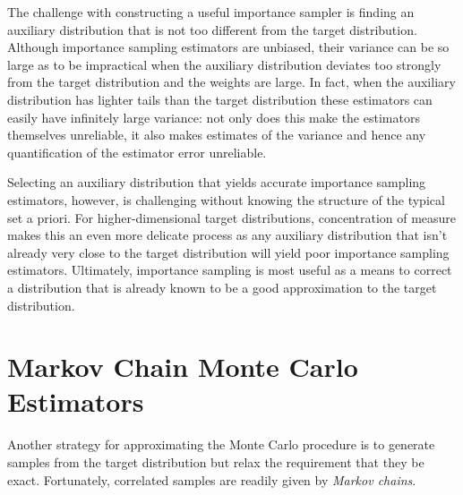 The challenge with constructing a useful importance sampler is
finding an auxiliary distribution that is not too different from the
target distribution.  Although importance sampling estimators are 
unbiased, their variance can be so large as to be impractical when 
the auxiliary distribution deviates too strongly from the target distribution 
and the weights are large.  In fact, when the auxiliary distribution has 
lighter tails than the target distribution these estimators can 
easily have infinitely large variance: not only does this make 
the estimators themselves unreliable, it also makes estimates of 
the variance and hence any quantification of the estimator error 
unreliable.

Selecting an auxiliary distribution that yields accurate importance
sampling estimators, however, is challenging without knowing
the structure of the typical set a priori.  For higher-dimensional
target distributions, concentration of measure makes this an even 
more delicate process as any auxiliary distribution that isn't
already very close to the target distribution will yield poor 
importance sampling estimators.  Ultimately, importance
sampling is most useful as a means to correct a distribution 
that is already known to be a good approximation to the target
distribution.

\section{Markov Chain Monte Carlo Estimators}

Another strategy for approximating the Monte Carlo procedure
is to generate samples from the target distribution but relax
the requirement that they be exact.  Fortunately, correlated 
samples are readily given by \emph{Markov chains}.


